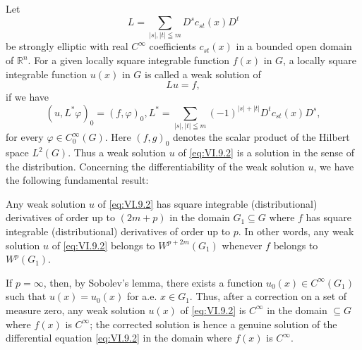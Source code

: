 \label{sec:VI.9}

Let 
\begin{equation}\label{eq:VI.9.1}
L = \sum\limits_{| s |, | t | \leqq m} D ^{s} c _{st} (x) D ^{t}
\end{equation}
be strongly elliptic with real $C^{\infty}$ coefficients $c_{st}(x)$ in a bounded open domain of $\mathbb{R}^{n}$. For a given locally square integrable function $f(x)$ in $G$, a locally square integrable function $u(x)$ in $G$ is called a weak solution of 
\begin{equation}\label{eq:VI.9.2}
L u = f,
\end{equation}
if we have 
\begin{equation}\label{eq:VI.9.3}
(u, L ^{*} \varphi) _{0} = (f, \varphi) _{0}, L ^{*} = \sum\limits_{| s |, | t | \leqq m} (- 1) ^{|s|+|t|} D ^{t} c _{st} (x) D ^{s},
\end{equation}
for every $\varphi \in C_0^\infty(G)$. Here $(f, g)_0$ denotes the scalar product of the Hilbert space $L^2(G)$. Thus a weak solution $u$ of \eqref{eq:VI.9.2} is a solution in the sense of the distribution. Concerning the differentiability of the weak solution $u$, we have the following fundamental result: 

\begin{theoremn} Any weak solution $u$ of \eqref{eq:VI.9.2} has square integrable (distributional) derivatives of order up to $(2m + p)$ in the domain $G_{1} \subseteq G$ where $f$ has square integrable (distributional) derivatives of order up to $p$. In other words, any weak solution $u$ of \eqref{eq:VI.9.2} belongs to $W^{p+2m}(G_1)$ whenever $f$ belongs to $W^{p}(G_{1})$.

\end{theoremn}
\begin{corollaryu} If $p = \infty$, then, by Sobolev's lemma, there exists a function $u_0(x) \in C^\infty(G_1)$ such that $u(x) = u_0(x)$ for a.e. $x \in G_1$. Thus, after a correction on a set of measure zero, any weak solution $u(x)$ of \eqref{eq:VI.9.2} is $C^\infty$ in the domain $\subseteq G$ where $f(x)$ is $C^\infty$; the corrected solution is hence a genuine solution of the differential equation \eqref{eq:VI.9.2} in the domain where $f(x)$ is $C^\infty$. 
\end{corollaryu}

